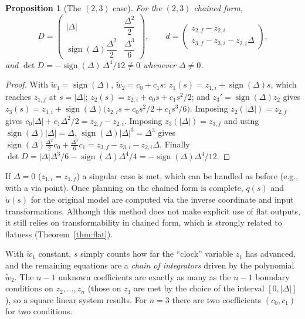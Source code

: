 \documentclass[11pt,a4paper]{article}
\def\boldsymbol#1{#1}%
\DeclareMathOperator{\sign}{sign}
\newcommand{\q}{\boldsymbol{q}}
\newcommand{\ut}{\tilde{\boldsymbol{u}}}
\newcommand{\wwt}{\tilde w}
\theoremstyle{definition}
\theoremstyle{plain}
\newtheorem{proposition}[definition]{Proposition}
\theoremstyle{remark}
\begin{document}
\begin{proposition}[The $(2,3)$ case]
For the $(2,3)$ chained form,
\begin{equation}
D=\begin{pmatrix}|\Delta|&\dfrac{\Delta^2}{2}\\[6pt]\sign(\Delta)\dfrac{\Delta^2}{2}&\dfrac{\Delta^3}{6}\end{pmatrix},\qquad
\boldsymbol d=\begin{pmatrix}z_{2,f}-z_{2,i}\\ z_{3,f}-z_{3,i}-z_{2,i}\Delta\end{pmatrix},
\end{equation}
and $\det D=-\sign(\Delta)\,\Delta^4/12\ne0$ whenever $\Delta\ne0$.
\end{proposition}
\begin{proof}
With $\wwt_1=\sign(\Delta)$, $\wwt_2=c_0+c_1s$: $z_1(s)=z_{1,i}+\sign(\Delta)s$, which reaches $z_{1,f}$ at $s=|\Delta|$;
$z_2(s)=z_{2,i}+c_0s+c_1s^2/2$; and $z_3'=\sign(\Delta)z_2$ gives
$z_3(s)=z_{3,i}+\sign(\Delta)\big(z_{2,i}s+c_0s^2/2+c_1s^3/6\big)$. Imposing $z_2(|\Delta|)=z_{2,f}$ gives
$c_0|\Delta|+c_1\Delta^2/2=z_{2,f}-z_{2,i}$. Imposing $z_3(|\Delta|)=z_{3,f}$ and using $\sign(\Delta)|\Delta|=\Delta$,
$\sign(\Delta)|\Delta|^3=\Delta^3$ gives
$\sign(\Delta)\tfrac{\Delta^2}{2}c_0+\tfrac{\Delta^3}{6}c_1=z_{3,f}-z_{3,i}-z_{2,i}\Delta$.
Finally $\det D=|\Delta|\Delta^3/6-\sign(\Delta)\Delta^4/4=-\sign(\Delta)\Delta^4/12$. \qedhere
\end{proof}

If $\Delta=0$ ($z_{1,i}=z_{1,f}$) a singular case is met, which can be handled as before (e.g., with a via point). Once planning
on the chained form is complete, $\q(s)$ and $\ut(s)$ for the original model are computed via the inverse coordinate and
input transformations. Although this method does not make explicit use of flat outputs, it still relies on transformability in chained form,
which is strongly related to flatness (Theorem~\ref{thm:flat}).

\begin{intuition}
With $\wwt_1$ constant, $s$ simply counts how far the ``clock'' variable $z_1$ has advanced, and the remaining equations are a
\emph{chain of integrators} driven by the polynomial $\wwt_2$. The $n-1$ unknown coefficients are exactly as many as the
$n-1$ boundary conditions on $z_2,\dots,z_n$ (those on $z_1$ are met by the choice of the interval $[0,|\Delta|]$), so a
square linear system results. For $n=3$ there are two coefficients $(c_0,c_1)$ for two conditions.
\end{intuition}
\end{document}
